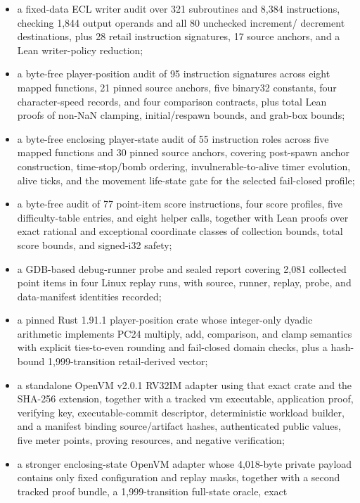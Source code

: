 \begin{itemize}
  \item a fixed-data ECL writer audit over 321 subroutines and 8,384
  instructions, checking 1,844 output operands and all 80 unchecked increment/
  decrement destinations, plus 28 retail instruction signatures, 17 source
  anchors, and a Lean writer-policy reduction;
  \item a byte-free player-position audit of 95 instruction signatures across
  eight mapped functions, 21 pinned source anchors, five binary32 constants,
  four character-speed records, and four comparison contracts, plus total Lean
  proofs of non-NaN clamping, initial/respawn bounds, and grab-box bounds;
  \item a byte-free enclosing player-state audit of 55 instruction roles across
  five mapped functions and 30 pinned source anchors, covering post-spawn
  anchor construction, time-stop/bomb ordering, invulnerable-to-alive timer
  evolution, alive ticks, and the movement life-state gate for the selected
  fail-closed profile;
  \item a byte-free audit of 77 point-item score instructions, four score
  profiles, five difficulty-table entries, and eight helper calls, together
  with Lean proofs over exact rational and exceptional coordinate classes of
  collection bounds, total score bounds, and signed-i32 safety;
  \item a GDB-based debug-runner probe and sealed report covering 2,081
  collected point items in four Linux replay runs, with source, runner, replay,
  probe, and data-manifest identities recorded;
  \item a pinned Rust 1.91.1  player-position crate whose
  integer-only dyadic arithmetic implements PC24 multiply, add, comparison, and
  clamp semantics with explicit ties-to-even rounding and fail-closed domain
  checks, plus a hash-bound 1,999-transition retail-derived vector;
  \item a standalone OpenVM v2.0.1 RV32IM adapter using that exact crate and
  the SHA-256 extension, together with a tracked vm executable, application
  proof, verifying key, executable-commit descriptor, deterministic workload
  builder, and a manifest binding source/artifact hashes, authenticated public
  values, five meter points, proving resources, and negative verification;
  \item a stronger enclosing-state OpenVM adapter whose 4,018-byte private
  payload contains only fixed configuration and replay masks, together with a
  second tracked proof bundle, a 1,999-transition full-state oracle, exact

\end{itemize}
